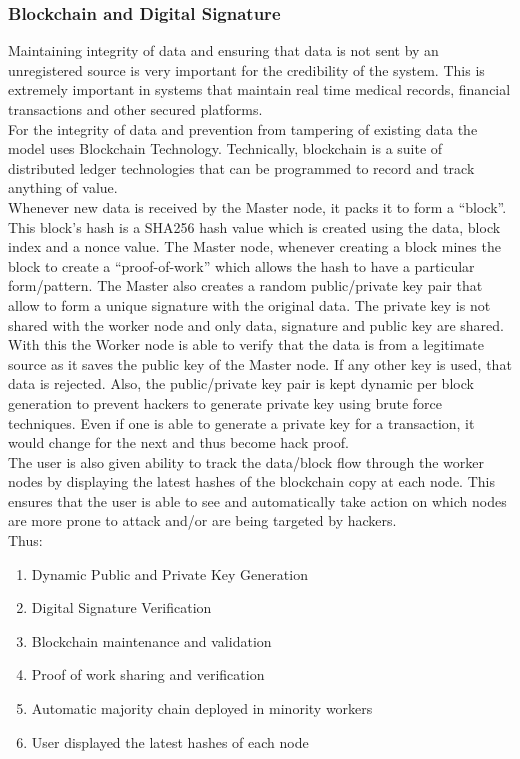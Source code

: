 \documentclass[10pt,journal,compsoc]{IEEEtran}
\begin{document}
\subsubsection{Blockchain and Digital Signature}
Maintaining integrity of data and ensuring that data is not sent by an unregistered source is very important for the credibility of the system. This is extremely important in systems that maintain real time medical records, financial transactions and other secured platforms. \\
For the integrity of data and prevention from tampering of existing data the model uses Blockchain Technology. Technically, blockchain is a suite of distributed ledger technologies that can be programmed to record and track anything of value. \\
Whenever new data is received by the Master node, it packs it to form a “block”. This block's hash is a SHA256 hash value which is created using the data, block index and a nonce value. The Master node, whenever creating a block mines the block to create a “proof-of-work” which allows the hash to have a particular form/pattern. The Master also creates a random public/private key pair that allow to form a unique signature with the original data. The private key is not shared with the worker node and only data, signature and public key are shared. With this the Worker node is able to verify that the data is from a legitimate source as it saves the public key of the Master node. If any other key is used, that data is rejected. Also, the public/private key pair is kept dynamic per block generation to prevent hackers to generate private key using brute force techniques. Even if one is able to generate a private key for a transaction, it would change for the next and thus become hack proof. \\
The user is also given ability to track the data/block flow through the worker nodes by displaying the latest hashes of the blockchain copy at each node. This ensures that the user is able to see and automatically take action on which nodes are more prone to attack and/or are being targeted by hackers.\\
Thus:
\begin{enumerate}
\item Dynamic Public and Private Key Generation
\item Digital Signature Verification
\item Blockchain maintenance and validation
\item Proof of work sharing and verification
\item Automatic majority chain deployed in minority workers
\item User displayed the latest hashes of each node
\end{enumerate}
\end{document}
